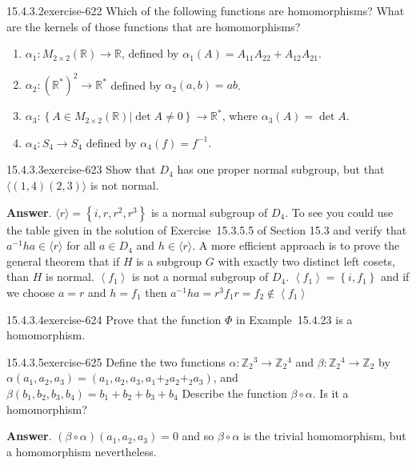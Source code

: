 \documentclass[twoside,10pt,]{book}
\numberwithin{equation}{section}
\begin{document}
\begin{divisionsolution}{15.4.3.2}{}{exercise-622}%
\hypertarget{p-5601}{}%
Which of the following functions are homomorphisms? What are the kernels of those functions that are homomorphisms?\leavevmode%
\begin{enumerate}[label=(\alph*)]
\item\hypertarget{li-2476}{}\hypertarget{p-5602}{}%
\(\alpha_1: M_{2\times 2}(\mathbb{R}) \rightarrow  \mathbb{R}\), defined by \(\alpha_1(A) = A_{11} A_{22} + A_{12} A_{21}\).%
\item\hypertarget{li-2477}{}\hypertarget{p-5603}{}%
\(\alpha_2 : \left(\mathbb{R}^*\right)^2 \rightarrow \mathbb{R}^*\) defined by \(\alpha_2 (a, b) = a b\).%
\item\hypertarget{li-2478}{}\hypertarget{p-5604}{}%
\(\alpha_3 : \left\{\left.A \in  M_{2\times 2}(\mathbb{R}) \right| \det  A \neq  0\right\} \to  \mathbb{R}^*\), where \(\alpha_3(A) = \det
A\).%
\item\hypertarget{li-2479}{}\hypertarget{p-5605}{}%
\(\alpha_4 : S_4\rightarrow  S_4\)  defined by \(\alpha_4(f)=f^{-1}\).%
\end{enumerate}
%
\end{divisionsolution}%
\begin{divisionsolution}{15.4.3.3}{}{exercise-623}%
\hypertarget{p-5606}{}%
Show that \(D_4\) has one proper normal subgroup, but that \(\langle (1,4)(2,3)\rangle\) is not normal.%
\par\smallskip%
\noindent\textbf{Answer}.\quad%
\hypertarget{p-5607}{}%
\(\langle r\rangle =\left\{i,r,r^2,r^3\right\}\) is a normal subgroup of \(D_4\). To see you could use the table given in the solution of Exercise~15.3.5.5 of Section 15.3 and verify that  \(a^{-1}h a \in \langle r\rangle\) for all \(a\in D_4\) and \(h\in \langle r\rangle\).   A more efficient approach is to prove the general theorem that if \(H\) is a subgroup \(G\) with exactly two distinct left cosets, than \(H\) is normal. \(\left\langle f_1\right\rangle\) is not a normal subgroup of \(D_4\).  \(\left\langle f_1\right\rangle =\left\{i,f_1\right\}\) and if we choose \(a = r\) and \(h=f_1\) then \(a^{-1}h a= r^3f_1r=f_2\notin \left\langle f_1\right\rangle\)%
\end{divisionsolution}%
\begin{divisionsolution}{15.4.3.4}{}{exercise-624}%
\hypertarget{p-5608}{}%
Prove that the function \(\Phi\) in Example~15.4.23 is a homomorphism.%
\end{divisionsolution}%
\begin{divisionsolution}{15.4.3.5}{}{exercise-625}%
\hypertarget{p-5609}{}%
Define the two functions  \(\alpha: \mathbb{Z}_2{}^3\rightarrow  \mathbb{Z}_2{}^4\)  and \(\beta :\mathbb{Z}_2{}^4\to \mathbb{Z}_2\) by \(\alpha\left(a_1,a_2,a_3 \right) = \left(a_1,a_2,a_3 ,a_1+_2 a_2+_2a_3\right)\), and \(\beta \left(b_1,b_2,b_3,b_4\right)=b_1+b_2+b_3+b_4\) Describe the function \(\beta \circ \alpha\). Is it a homomorphism?%
\par\smallskip%
\noindent\textbf{Answer}.\quad%
\hypertarget{p-5610}{}%
\((\beta \circ  \alpha )\left(a_1,a_2,a_3\right) = 0\)  and so \(\beta \circ \alpha\)  is the trivial homomorphism, but a homomorphism nevertheless.%
\end{divisionsolution}%
\end{document}

